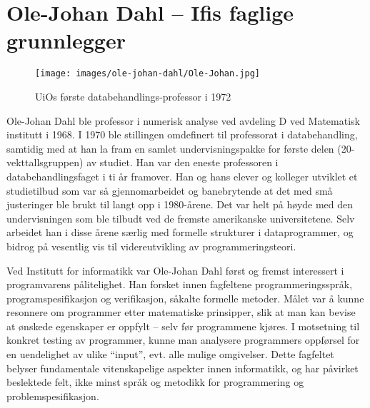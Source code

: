 \chapter[Ole-Johan Dahl]{Ole-Johan Dahl – Ifis faglige grunnlegger}

\author{Skrevet av Narve Trædal}

\begin{figure}
	\texttt{[image: images/ole-johan-dahl/Ole-Johan.jpg]}
	\label{fig:ole-johan}
	\caption{UiOs første databehandlings-professor i 1972}
\end{figure}

Ole-Johan Dahl ble professor i numerisk analyse ved avdeling D ved Matematisk institutt i 1968. I 1970 ble stillingen omdefinert til professorat i databehandling, samtidig med at han la fram en samlet undervisningspakke for første delen (20-vekttallsgruppen) av studiet. Han var den eneste professoren i databehandlingsfaget i ti år framover. Han og hans elever og kolleger utviklet et studietilbud som var så gjennomarbeidet og banebrytende at det med små justeringer ble brukt til langt opp i 1980-årene. Det var helt på høyde med den undervisningen som ble tilbudt ved de fremste amerikanske universitetene. Selv arbeidet han i disse årene særlig med formelle strukturer i dataprogrammer, og bidrog på vesentlig vis til videreutvikling av programmeringsteori.

Ved Institutt for informatikk var Ole-Johan Dahl først og fremst interessert i programvarens pålitelighet. Han forsket innen fagfeltene programmeringsspråk, programspesifikasjon og verifikasjon, såkalte formelle metoder. Målet var å kunne resonnere om programmer etter matematiske prinsipper, slik at man kan bevise at ønskede egenskaper er oppfylt – selv før programmene kjøres. I motsetning til konkret testing av programmer, kunne man analysere programmers oppførsel for en uendelighet av ulike ``input'', evt. alle mulige omgivelser. Dette fagfeltet belyser fundamentale vitenskapelige aspekter innen informatikk, og har påvirket beslektede felt, ikke minst språk og metodikk for programmering og problemspesifikasjon.

